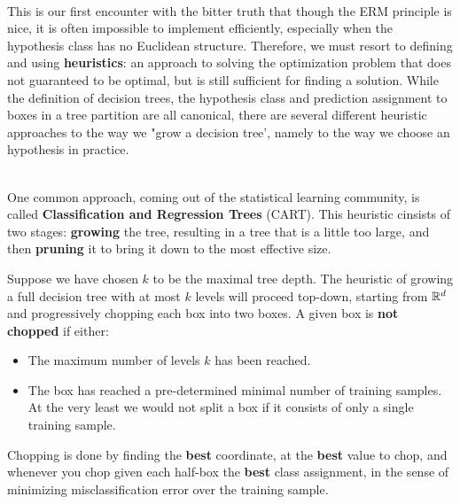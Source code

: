 ~\\This is our first encounter with the bitter truth that though the ERM principle is nice, it is often impossible to implement efficiently, especially when the hypothesis class has no Euclidean structure. Therefore, we must resort to defining and using \textbf{heuristics}: an approach to solving the optimization problem that does not guaranteed to be optimal, but is still sufficient for finding a solution. While the definition of decision trees, the hypothesis class and prediction assignment to boxes in a tree partition are all canonical, there are several different heuristic approaches to the way we "grow a decision tree', namely to the way we choose an hypothesis in practice.

~\\One common approach, coming out of the statistical learning community, is called \textbf{Classification and Regression Trees} (CART). This heuristic cinsists of two stages: \textbf{growing} the tree, resulting in a tree that is a little too large, and then \textbf{pruning} it to bring it down to the most effective size.

Suppose we have chosen $k$ to be the maximal tree depth. The heuristic of growing a full decision tree with at most $k$ levels will proceed top-down, starting from $\mathbb{R}^d$ and progressively chopping each box into two boxes. A given box is \textbf{not chopped} if either:
\begin{itemize}
	\item The maximum number of levels $k$ has been reached.
	\item The box has reached a pre-determined minimal number of training samples. At the very least we would not split a box if it consists of only a single training sample.
\end{itemize}

Chopping is done by finding the \textbf{best} coordinate, at the \textbf{best} value to chop, and whenever you chop given each half-box the \textbf{best} class assignment, in the sense of minimizing misclassification error over the training sample.


